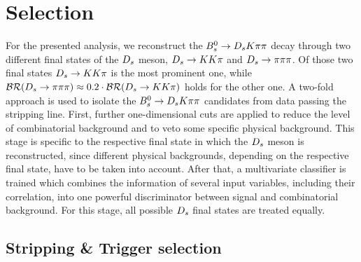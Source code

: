 
\section{Selection}
\label{sec:Selection}

For the presented analysis, we reconstruct the ${{B}^0_{s}}\rightarrow{\ensuremath{{D}_{s}}}{\ensuremath{K}}{\ensuremath{\pi}}{\ensuremath{\pi}}$ decay through two different final states of the ${{D}_{s}}$ meson, ${{D}_{s}}\rightarrow{\ensuremath{K}}{\ensuremath{K}}{\ensuremath{\pi}}$ and ${{D}_{s}}\rightarrow{\ensuremath{\pi}}{\ensuremath{\pi}}{\ensuremath{\pi}}$.
Of those two final states ${{D}_{s}}\rightarrow{\ensuremath{K}}{\ensuremath{K}}{\ensuremath{\pi}}$ is the most prominent one,
while $\mathcal{BR}({{D}_{s}}\rightarrow{\ensuremath{\pi}}{\ensuremath{\pi}}{\ensuremath{\pi}}) \approx 0.2\cdot\mathcal{BR}({{D}_{s}}\rightarrow{\ensuremath{K}}{\ensuremath{K}}{\ensuremath{\pi}})$ holds for the other one. \newline
A two-fold approach is used to isolate the ${{B}^0_{s}}\rightarrow{\ensuremath{{D}_{s}}}{\ensuremath{K}}{\ensuremath{\pi}}{\ensuremath{\pi}}$ candidates from data passing the stripping line. 
First, further one-dimensional cuts are applied to reduce the level of combinatorial background and to veto some specific physical background. 
This stage is specific to the respective final state in which the ${{D}_{s}}$ meson is reconstructed, since different physical backgrounds, depending on the respective final state, have to be taken into account.   
After that, a multivariate classifier is trained which combines the information of several input variables, including their correlation, into one powerful discriminator
between signal and combinatorial background. For this stage, all possible ${{D}_{s}}$ final states are treated equally. 

\subsection{Stripping \& Trigger selection}

